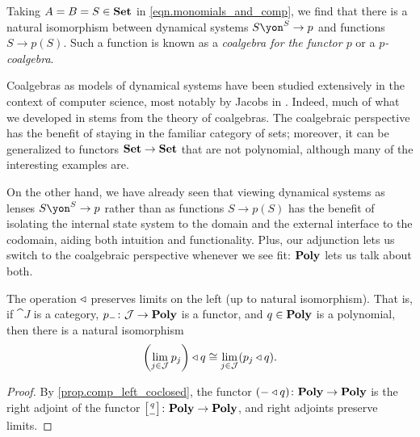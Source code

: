 \documentclass[Book-Poly]{subfiles}
\begin{document}
\begin{example} \label{ex.coalgebras}
Taking $A=B=S\in\mathbf{Set}$ in \eqref{eqn.monomials_and_comp}, we find that there is a natural isomorphism between dynamical systems $S\yon^S\to p$ and functions $S\to p(S)$.
Such a function is known as a \emph{coalgebra for the functor $p$} or a \emph{$p$-coalgebra}.%

Coalgebras as models of dynamical systems have been studied extensively in the context of computer science, most notably by Jacobs in \cite{jacobs2017introduction}.
Indeed, much of what we developed in \label{sec.poly.dyn_sys.moore,sec.poly.dyn_sys.depend_sys} stems from the theory of coalgebras.
The coalgebraic perspective has the benefit of staying in the familiar category of sets; moreover, it can be generalized to functors $\mathbf{Set}\to\mathbf{Set}$ that are not polynomial, although many of the interesting examples are.

On the other hand, we have already seen that viewing dynamical systems as lenses $S\yon^S\to p$ rather than as functions $S\to p(S)$ has the benefit of isolating the internal state system to the domain and the external interface to the codomain, aiding both intuition and functionality.
Plus, our adjunction lets us switch to the coalgebraic perspective whenever we see fit: $\mathbf{Poly}$ lets us talk about both.
\end{example}


\begin{proposition} \label{prop.left_pres_lim}
The operation $\mathbin{\triangleleft}$ preserves limits on the left (up to natural isomorphism).
That is, if $\cat{J}$ is a category, $p_-\colon\mathcal{J}\to\mathbf{Poly}$ is a functor, and $q\in\mathbf{Poly}$ is a polynomial, then there is a natural isomorphism
\begin{equation} \label{eqn.comp_left_pres_lim}
    \left(\lim_{j\in\mathcal{J}}p_j\right)\mathbin{\triangleleft} q\cong\lim_{j\in\mathcal{J}}(p_j\mathbin{\triangleleft} q).
\end{equation}
\end{proposition}
\begin{proof}
By \cref{prop.comp_left_coclosed}, the functor $(-\mathbin{\triangleleft} q)\colon\mathbf{Poly}\to\mathbf{Poly}$ is the right adjoint of the functor $\lchom{q}{-}\colon\poly\to\poly$, and right adjoints preserve limits.
\end{proof}
\end{document}
